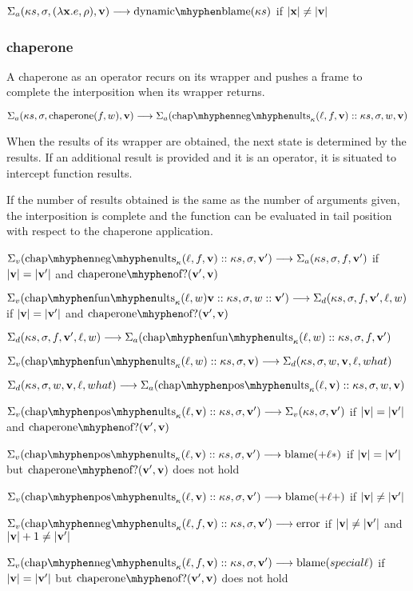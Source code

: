 \documentclass{sigplanconf}
\begin{document}
$\red{\sapp{\ks}{\sigma}{(\lambda\mathbf{x}.e,\rho)}{\vv}}{\dynbla{\ks}}$
if $|\mathbf{x}|\ne|\mathbf{v}|$

\subsubsection{chaperone}

A chaperone as an operator recurs on its wrapper and pushes a frame to complete the interposition when its wrapper returns.

$\red{\sapp{\ks}{\sigma}{\mathrm{chaperone}(f,w)}{\vv}}{\sapp{\chacwk{f}{\vv}::\ks}{\sigma}{w}{\vv}}$

When the results of its wrapper are obtained, the next state is determined by the results.
If an additional result is provided and it is an operator, it is situated to intercept function results.

If the number of results obtained is the same as the number of arguments given, the interposition is complete and the function can be evaluated in tail position with respect to the chaperone application.

$\red{\sval{\chacwk{f}{\vv}::\ks}{\sigma}{\vvp}}{\sapp{\ks}{\sigma}{f}{\vvp}}$
if $|\mathbf{v}|=|\mathbf{v'}|$ and $\mathrm{chaperone\mhyphen of?}(\vvp,\vv)$

$\red{\sval{\chacfk{w}{\vv}::\ks}{\sigma}{w::\vvp}}{\sdum{\ks}{\sigma}{f}{\vvp}{\ell}{w}}$
if $|\mathbf{v}|=|\mathbf{v'}|$ and $\mathrm{chaperone\mhyphen of?}(\vvp,\vv)$

$\red{\sdum{\ks}{\sigma}{f}{\vvp}{\ell}{w}}{\sapp{\chacfk{w}::\ks}{\sigma}{f}{\vvp}}$

$\red{\sval{\chacfk{w}::\ks}{\sigma}{\vv}}{\sdum{\ks}{\sigma}{w}{\vv}{\ell}{what}}$

$\red{\sdum{\ks}{\sigma}{w}{\vv}{\ell}{what}}{\sapp{\chacrk{\vv}::\ks}{\sigma}{w}{\vv}}$

$\red{\sval{\chacrk{\vv}::\ks}{\sigma}{\vvp}}{\sval{\ks}{\sigma}{\vvp}}$
if $|\mathbf{v}|=|\mathbf{v'}|$ and $\mathrm{chaperone\mhyphen of?}(\vvp,\vv)$

$\red{\sval{\chacrk{\vv}::\ks}{\sigma}{\vvp}}{\sbla{+\ell*}}$
if $|\mathbf{v}|=|\mathbf{v'}|$ but $\mathrm{chaperone\mhyphen of?}(\vvp,\vv)$ does not hold

$\red{\sval{\chacrk{\vv}::\ks}{\sigma}{\vvp}}{\sbla{+\ell+}}$
if $|\mathbf{v}|\ne|\mathbf{v'}|$

$\red{\sval{\chacwk{f}{\vv}::\ks}{\sigma}{\vvp}}{\serr}$
if $|\mathbf{v}|\ne|\mathbf{v'}|$ and $|\mathbf{v}|+1\ne|\mathbf{v'}|$

$\red{\sval{\chacwk{f}{\vv}::\ks}{\sigma}{\vvp}}{\sbla{special\ell}}$
if $|\mathbf{v}|=|\mathbf{v'}|$ but $\mathrm{chaperone\mhyphen of?}(\vvp,\vv)$ does not hold
\end{document}
